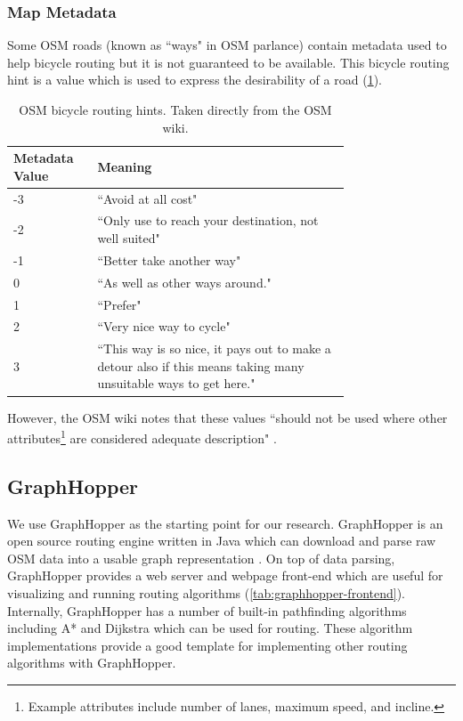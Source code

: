 \documentclass[honors]{union-cs-thesis}
\begin{document}
\subsubsection{Map Metadata}
Some OSM roads (known as ``ways" in OSM parlance) contain metadata used to help bicycle routing but it is not guaranteed to be available. This bicycle routing hint is a value which is used to express the desirability of a road (\cref{tab:osm-hint}).  
\begin{table}
\begin{center}
    \begin{tabular}{|l|p{0.75\linewidth}|}
        \hline
        \textbf{Metadata Value} & \textbf{Meaning} \\
        \hline
        -3 & ``Avoid at all cost" \\
        \hline
        -2 & ``Only use to reach your destination, not well suited" \\
        \hline
        -1 & ``Better take another way" \\
        \hline
        0 & ``As well as other ways around." \\
        \hline
        1 & ``Prefer" \\
        \hline
        2 & ``Very nice way to cycle" \\
        \hline
        3 & ``This way is so nice, it pays out to make a detour also if this means taking many unsuitable ways to get here." \\
        \hline
    \end{tabular}
\end{center}
\caption{OSM bicycle routing hints. Taken directly from the OSM wiki.}
\label{tab:osm-hint}
\end{table}
However, the OSM wiki notes that these values ``should not be used where other attributes\footnote{Example attributes include number of lanes, maximum speed, and incline.} are considered adequate description" \cite{osm}.

\subsection{GraphHopper}
\label{sec:graphhopper}
We use GraphHopper as the starting point for our research. GraphHopper is an open source routing engine written in Java which can download and parse raw OSM data into a usable graph representation \cite{graphhopper}. On top of data parsing, GraphHopper provides a web server and webpage front-end which are useful for visualizing and running routing algorithms (\cref{tab:graphhopper-frontend}). Internally, GraphHopper has a number of built-in pathfinding algorithms including A* and Dijkstra which can be used for routing. These algorithm implementations provide a good template for implementing other routing algorithms with GraphHopper. 
\end{document}
